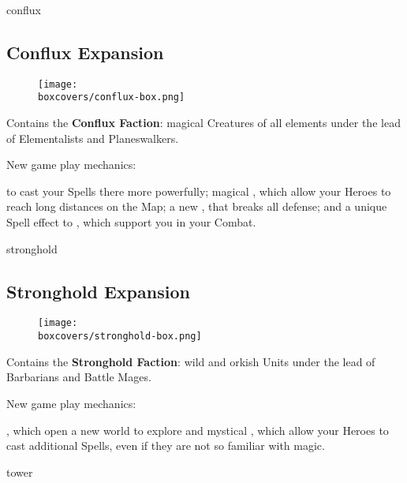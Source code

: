 \begin{multicols}{2}
\begin{expansion}[title=]{conflux}
   \subsection*{\color{conflux}Conflux Expansion}
   \setlength\intextsep{0pt}
   \setlength\columnsep{0.8em}
   \begin{wrapfigure}{l}{0.35\textwidth}
       \texttt{[image: \\boxcovers/conflux-box.png]}
   \end{wrapfigure}
   Contains the \textbf{Conflux Faction}: magical Creatures of all elements under the lead of Elementalists and Planeswalkers.\par
   \medskip
   New game play mechanics:\par
   \smallskip
    to cast your Spells there more powerfully; magical , which allow your Heroes to reach long distances on the Map; a new  , that breaks all defense; and a unique Spell effect to , which support you in your Combat.
\end{expansion}
\vspace*{\fill}

\columnbreak
\begin{expansion}[title=]{stronghold}
    \subsection*{\color{stronghold}Stronghold Expansion}
    \setlength\intextsep{0pt}
    \setlength\columnsep{0.8em}
    \begin{wrapfigure}{l}{0.35\textwidth}
        \texttt{[image: \\boxcovers/stronghold-box.png]}
    \end{wrapfigure}
    Contains the \textbf{Stronghold Faction}: wild and orkish Units under the lead of Barbarians and Battle Mages.\par
    \medskip
    New game play mechanics:\par
    \smallskip
    , which open a new world to explore and mystical , %
    which allow your Heroes to cast additional Spells, even if they are not so familiar with magic.
\end{expansion}

\vspace*{1em}
\begin{expansion}[title=]{tower}

\end{expansion}
\end{multicols}
